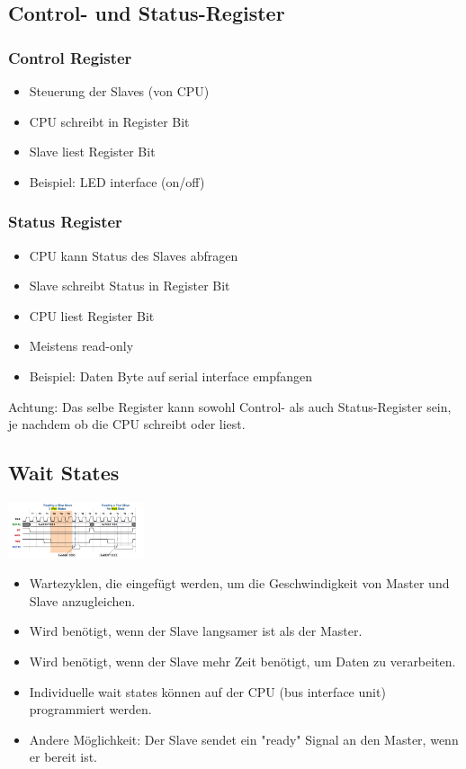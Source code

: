 \subsection{Control- und Status-Register}
\subsubsection{Control Register}
\begin{itemize}
    \item Steuerung der Slaves (von CPU)
    \item CPU schreibt in Register Bit
    \item Slave liest Register Bit
    \item Beispiel: LED interface (on/off)
\end{itemize}
\subsubsection{Status Register}
\begin{itemize}
    \item CPU kann Status des Slaves abfragen
    \item Slave schreibt Status in Register Bit
    \item CPU liest Register Bit
    \item Meistens read-only
    \item Beispiel: Daten Byte auf serial interface empfangen
\end{itemize}

Achtung: Das selbe Register kann sowohl Control- als auch Status-Register sein, je nachdem ob die CPU schreibt oder liest.

\subsection{Wait States}
\includegraphics[width=0.3\textwidth]{sections/images/wait_state.png}
\begin{itemize}
    \item Wartezyklen, die eingefügt werden, um die Geschwindigkeit von Master und Slave anzugleichen.
    \item Wird benötigt, wenn der Slave langsamer ist als der Master.
    \item Wird benötigt, wenn der Slave mehr Zeit benötigt, um Daten zu verarbeiten.
    \item Individuelle wait states können auf der CPU (bus interface unit) programmiert werden.
    \item Andere Möglichkeit: Der Slave sendet ein "ready" Signal an den Master, wenn er bereit ist.
\end{itemize}

